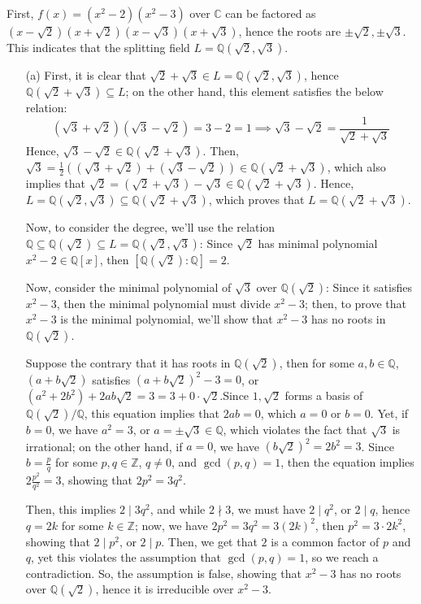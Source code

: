 \documentclass{article}
\newcommand{\QQ}{\mathbb{Q}}
\newcommand{\CC}{\mathbb{C}}
\begin{document}
First, $f(x)=(x^2-2)(x^2-3)$ over $\CC$ can be factored as $(x-\sqrt{2})(x+\sqrt{2})(x-\sqrt{3})(x+\sqrt{3})$, hence the roots are $\pm\sqrt{2},\pm\sqrt{3}$. This indicates that the splitting field $L=\QQ(\sqrt{2},\sqrt{3})$.
\begin{itemize}
    \item[(a)] First, it is clear that $\sqrt{2}+\sqrt{3}\in L=\QQ(\sqrt{2},\sqrt{3})$, hence $\QQ(\sqrt{2}+\sqrt{3})\subseteq L$; on the other hand, this element satisfies the below relation:
    \begin{equation}
        \label{eq:5}
        (\sqrt{3}+\sqrt{2})(\sqrt{3}-\sqrt{2}) = 3-2 = 1\implies \sqrt{3}-\sqrt{2}=\frac{1}{\sqrt{2}+\sqrt{3}}
    \end{equation}
    Hence, $\sqrt{3}-\sqrt{2}\in \QQ(\sqrt{2}+\sqrt{3})$. Then, $\sqrt{3} = \frac{1}{2}((\sqrt{3}+\sqrt{2})+(\sqrt{3}-\sqrt{2}))\in\QQ(\sqrt{2}+\sqrt{3})$, which also implies that $\sqrt{2} = (\sqrt{2}+\sqrt{3})-\sqrt{3}\in \QQ(\sqrt{2}+\sqrt{3})$. Hence, $L=\QQ(\sqrt{2},\sqrt{3})\subseteq \QQ(\sqrt{2}+\sqrt{3})$, which proves that $L=\QQ(\sqrt{2}+\sqrt{3})$.

    Now, to consider the degree, we'll use the relation $\QQ\subseteq \QQ(\sqrt{2})\subseteq L=\QQ(\sqrt{2},\sqrt{3})$: Since $\sqrt{2}$ has minimal polynomial $x^2-2\in\QQ[x]$, then $[\QQ(\sqrt{2}):\QQ]=2$. 
    
    Now, consider the minimal polynomial of $\sqrt{3}$ over $\QQ(\sqrt{2})$: Since it satisfies $x^2-3$, then the minimal polynomial must divide $x^2-3$; then, to prove that $x^2-3$ is the minimal polynomial, we'll show that $x^2-3$ has no roots in $\QQ(\sqrt{2})$. 
    
    Suppose the contrary that it has roots in $\QQ(\sqrt{2})$, then for some $a,b\in \QQ$, $(a+b\sqrt{2})$ satisfies $(a+b\sqrt{2})^2-3 = 0$, or $(a^2+2b^2)+2ab\sqrt{2} = 3 = 3+0\cdot \sqrt{2}$.Since $1,\sqrt{2}$ forms a basis of $\QQ(\sqrt{2})/\QQ$, this equation implies that $2ab = 0$, which $a = 0$ or $b=0$. Yet, if $b=0$, we have $a^2=3$, or $a=\pm\sqrt{3}\in\QQ$, which violates the fact that $\sqrt{3}$ is irrational; on the other hand, if $a=0$, we have $(b\sqrt{2})^2 = 2b^2 =3$. Since $b = \frac{p}{q}$ for some $p,q\in\mathbb{Z}$, $q\neq 0$, and $\gcd(p,q)=1$, then the equation implies $2\frac{p^2}{q^2}=3$, showing that $2p^2=3q^2$. 
    
    Then, this implies $2\mid 3q^2$, and while $2\nmid 3$, we must have $2\mid q^2$, or $2\mid q$, hence $q = 2k$ for some $k\in\mathbb{Z}$; now, we have $2p^2 = 3q^2 = 3(2k)^2$, then $p^2 = 3\cdot 2k^2$, showing that $2\mid p^2$, or $2\mid p$. Then, we get that $2$ is a common factor of $p$ and $q$, yet this violates the assumption that $\gcd(p,q)=1$, so we reach a contradiction. So, the assumption is false, showing that $x^2-3$ has no roots over $\QQ(\sqrt{2})$, hence it is irreducible over $x^2-3$.


\end{itemize}
\end{document}
